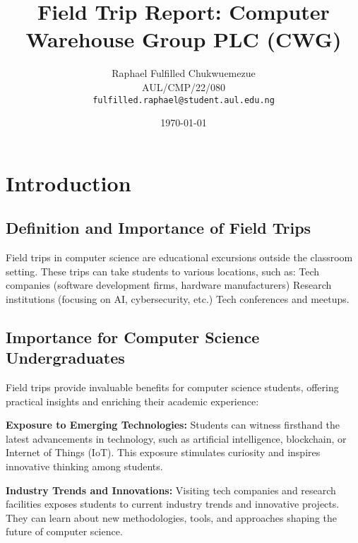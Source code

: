 \documentclass[a4paper,12pt]{report}
\begin{document}
	
	\title{Field Trip Report: Computer Warehouse Group PLC (CWG)}
	\author{Raphael Fulfilled Chukwuemezue \\
		\vspace{1cm}
		AUL/CMP/22/080 \\
		\vspace{1cm}
		\texttt{fulfilled.raphael@student.aul.edu.ng}
	}
	\date{\today}
	\maketitle
	
	\tableofcontents
	\newpage
	
	\chapter{Introduction}
	
	\section{Definition and Importance of Field Trips}
	Field trips in computer science are educational excursions outside the classroom setting. These trips can take students to various locations, such as: Tech companies (software development firms, hardware manufacturers) Research institutions (focusing on AI, cybersecurity, etc.) Tech conferences and meetups.
	
	
	\section{Importance for Computer Science Undergraduates}
	
	Field trips provide invaluable benefits for computer science students, offering practical insights and enriching their academic experience:
	
	\vspace{\baselineskip}
	
	\textbf{Exposure to Emerging Technologies:} Students can witness firsthand the latest advancements in technology, such as artificial intelligence, blockchain, or Internet of Things (IoT). This exposure stimulates curiosity and inspires innovative thinking among students.
	
	\vspace{\baselineskip}
	
	\textbf{Industry Trends and Innovations:} Visiting tech companies and research facilities exposes students to current industry trends and innovative projects. They can learn about new methodologies, tools, and approaches shaping the future of computer science.
	
\end{document}
